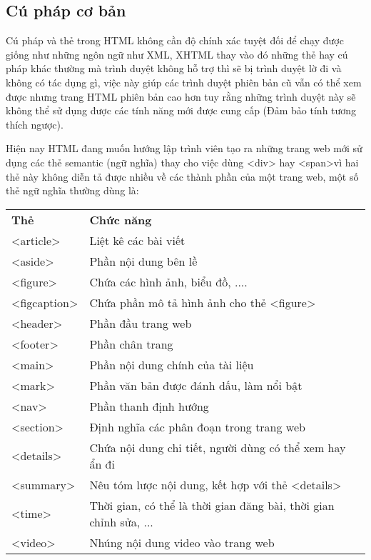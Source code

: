 \subsection{Cú pháp cơ bản}
Cú pháp và thẻ trong HTML không cần độ chính xác tuyệt đối để chạy được
giống như những ngôn ngữ như XML, XHTML thay vào đó những thẻ hay cú pháp khác thường mà trình duyệt không hỗ trợ thì sẽ bị trình duyệt lờ đi và không có tác dụng gì, việc này giúp các trình duyệt phiên bản cũ vẫn có thể xem được nhưng trang HTML phiên bản cao hơn tuy rằng những trình duyệt này sẽ không thể sử dụng được các tính năng mới được cung cấp (Đảm bảo tính tương thích ngược).\par
Hiện nay HTML đang muốn hướng lập trình viên tạo ra những trang web mới sử dụng các thẻ semantic (ngữ nghĩa) thay cho việc dùng <div> hay <span>vì hai thẻ này không diễn tả được nhiều về các thành phần của một trang web, một số thẻ ngữ nghĩa thường dùng là:
\begin{center}
\begin{tabular}{|l|l|}
    \cline{1-2}
    \textbf{Thẻ} & \textbf{Chức năng} \\ \cline{1-2}
    <article> & Liệt kê các bài viết \\ \cline{1-2}
    <aside> & Phần nội dung bên lề \\ \cline{1-2}
    <figure> & Chứa các hình ảnh, biểu đồ, .... \\ \cline{1-2}
    <figcaption> & Chứa phần mô tả hình ảnh cho thẻ <figure> \\ \cline{1-2}
    <header> & Phần đầu trang web \\ \cline{1-2}
    <footer> & Phần chân trang \\ \cline{1-2}
    <main> & Phần nội dung chính của tài liệu \\ \cline{1-2}
    <mark> & Phần văn bản được đánh dấu, làm nổi bật \\ \cline{1-2}
    <nav> & Phần thanh định hướng \\ \cline{1-2}
    <section> & Định nghĩa các phân đoạn trong trang web \\ \cline{1-2}
    <details> & Chứa nội dung chi tiết, người dùng có thể xem hay ẩn đi \\ \cline{1-2}
    <summary> & Nêu tóm lược nội dung, kết hợp với thẻ <details> \\ \cline{1-2}
    <time> & Thời gian, có thể là thời gian đăng bài, thời gian chỉnh sửa, ... \\ \cline{1-2}
    <video> & Nhúng nội dung video vào trang web \\ \cline{1-2}
\end{tabular}
\end{center}

